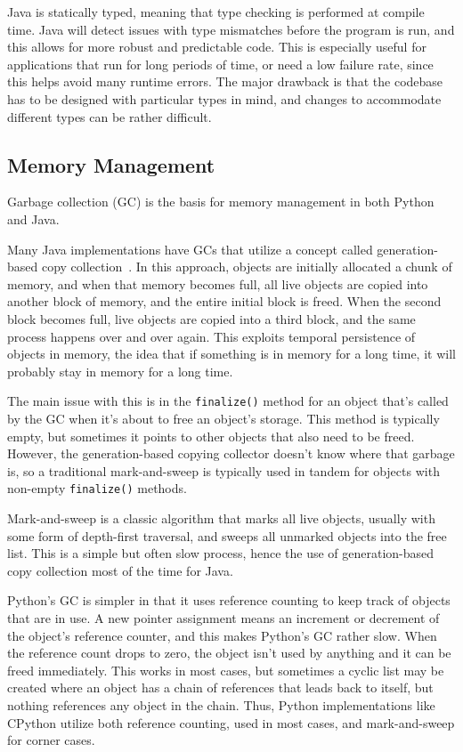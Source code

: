 Java is statically typed, meaning that type checking is performed at compile time. Java will detect issues with type mismatches before the program is run, and this allows for more robust and predictable code. This is especially useful for applications that run for long periods of time, or need a low failure rate, since this helps avoid many runtime errors. The major drawback is that the codebase has to be designed with particular types in mind, and changes to accommodate different types can be rather difficult.

\subsection{Memory Management}
Garbage collection (GC) is the basis for memory management in both Python and Java. 

Many Java implementations have GCs that utilize a concept called generation-based copy collection~\cite{cornellGC}. In this approach, objects are initially allocated a chunk of memory, and when that memory becomes full, all live objects are copied into another block of memory, and the entire initial block is freed. When the second block becomes full, live objects are copied into a third block, and the same process happens over and over again. This exploits temporal persistence of objects in memory, the idea that if something is in memory for a long time, it will probably stay in memory for a long time. 

The main issue with this is in the \texttt{finalize()} method for an object that's called by the GC when it's about to free an object's storage. This method is typically empty, but sometimes it points to other objects that also need to be freed. However, the generation-based copying collector doesn’t know where that garbage is, so a traditional mark-and-sweep is typically used in tandem for objects with non-empty \texttt{finalize()} methods.

Mark-and-sweep is a classic algorithm that marks all live objects, usually with some form of depth-first traversal, and sweeps all unmarked objects into the free list. This is a simple but often slow process, hence the use of generation-based copy collection most of the time for Java.

Python's GC is simpler in that it uses reference counting to keep track of objects that are in use. A new pointer assignment means an increment or decrement of the object's reference counter, and this makes Python's GC rather slow. When the reference count drops to zero, the object isn't used by anything and it can be freed immediately. This works in most cases, but sometimes a cyclic list may be created where an object has a chain of references that leads back to itself, but nothing references any object in the chain. Thus, Python implementations like CPython utilize both reference counting, used in most cases, and mark-and-sweep for corner cases.

